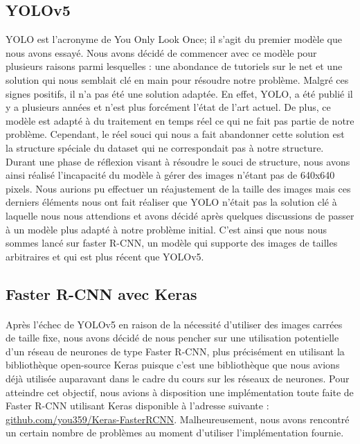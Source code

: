 \subsection{YOLOv5}
YOLO est l'acronyme de You Only Look Once; il s'agit du premier modèle que nous avons essayé. Nous avons décidé de commencer avec ce modèle pour plusieurs raisons parmi lesquelles : une abondance de tutoriels sur le net et une solution qui nous semblait clé en main pour résoudre notre problème. Malgré ces signes positifs, il n’a pas été une solution adaptée. \newline
En effet, YOLO, a été publié il y a plusieurs années et n’est plus forcément l’état de l’art actuel. De plus, ce modèle est adapté à du traitement en temps réel ce qui ne fait pas partie de notre problème. Cependant, le réel souci qui nous a fait abandonner cette solution est la structure spéciale du dataset qui ne correspondait pas à notre structure. \newline 
Durant une phase de réflexion visant à résoudre le souci de structure, nous avons ainsi réalisé l’incapacité du modèle à gérer des images n’étant pas de 640x640 pixels. Nous aurions pu effectuer un réajustement de la taille des images mais ces derniers éléments nous ont fait réaliser que YOLO n’était pas la solution clé à laquelle nous nous attendions et avons décidé après quelques discussions de passer à un modèle plus adapté à notre problème initial. C'est ainsi que nous nous sommes lancé sur faster R-CNN, un modèle qui supporte des images de tailles arbitraires et qui est plus récent que YOLOv5.

\subsection{Faster R-CNN avec Keras}

\paragraph{} Après l'échec de YOLOv5 en raison de la nécessité d'utiliser des images carrées de taille fixe, nous avons décidé de nous pencher sur une utilisation potentielle d'un réseau de neurones de type Faster R-CNN, plus précisément en utilisant la bibliothèque open-source Keras puisque c'est une bibliothèque que nous avions déjà utilisée auparavant dans le cadre du cours sur les réseaux de neurones. Pour atteindre cet objectif, nous avions à disposition une implémentation toute faite de Faster R-CNN utilisant Keras disponible à l'adresse suivante : \url{github.com/you359/Keras-FasterRCNN}. Malheureusement, nous avons rencontré un certain nombre de problèmes au moment d'utiliser l'implémentation fournie.


